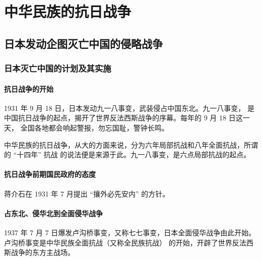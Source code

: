 \documentclass[10pt, UTF8]{book} %
\begin{document}

\newpage
\thispagestyle{empty}

\chapter{中华民族的抗日战争}

\section{日本发动企图灭亡中国的侵略战争}

\subsection{日本灭亡中国的计划及其实施}

\subsubsection{抗日战争的开始}

1931 年 9 月 18 日，日本发动九一八事变，武装侵占中国东北。九一八事变，
是中国抗日战争的起点，揭开了世界反法西斯战争的序幕。每年的 9 月 18 日这一天，
全国各地都会响起警报，勿忘国耻，警钟长鸣。

\begin{remark}
    中华民族的抗日战争，从大的方面来说，分为六年局部抗战和八年全面抗战，所谓的 “十四年” 抗战
    的说法便是来源于此。九一八事变，是六点局部抗战的起点。
\end{remark}

\subsubsection{抗日战争前期国民政府的态度}

蒋介石在 1931 年 7 月提出 “攘外必先安内” 的方针。

\subsubsection{占东北、侵华北到全面侵华战争}

1937 年 7 月 7 日爆发卢沟桥事变，又称七七事变，日本全面侵华战争由此开始。卢沟桥事变是中华民族全面抗战（又称全民族抗战）
的开始，开辟了世界反法西斯战争的东方主战场。
\end{document}
